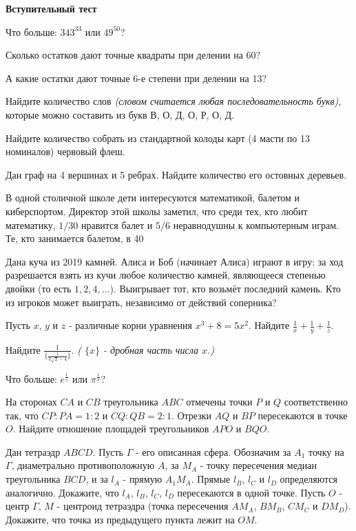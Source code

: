 \documentclass[12pt, a4paper]{article}
\begin{document}
\setcounter{iii}{0}

\begin{center}
	\textbf{Вступительный тест}
\end{center}

\ii Что больше: $343^{33}$ или $49^{50}$?

\ii Сколько остатков дают точные квадраты при делении на 60?

\ii А какие остатки дают точные 6-е степени при делении на 13?

\ii Найдите количество слов \textit{(словом считается любая последовательность букв)}, которые можно составить из букв В, О, Д, О, Р, О, Д. 

\ii Найдите количество собрать из стандартной колоды карт (4 масти по 13 номиналов) червовый флеш.

\ii Дан граф на 4 вершинах и 5 ребрах. Найдите количество его остовных деревьев.

\ii В одной столичной школе дети интересуются математикой, балетом и киберспортом. Директор этой школы заметил, что среди тех, кто любит математику, $1/30$ нравится балет и $5/6$ неравнодушны к компьютерным играм. Те, кто занимается балетом, в 40%

\ii Дана куча из 2019 камней. Алиса и Боб (начинает Алиса) играют в игру: за ход разрешается взять из кучи любое количество камней, являющееся степенью двойки (то есть $1, 2, 4, \dots$). Выигрывает тот, кто возьмёт последний камень. Кто из игроков может выиграть, независимо от действий соперника?

\ii Пусть $x$, $y$ и $z$ - различные корни уравнения $x^3+8=5x^2$. Найдите $\frac{1}{x}+\frac{1}{y}+\frac{1}{z}$.

\ii Найдите $\frac{1}{ \{ \frac{1}{ 3\sqrt{2} - 4 } \} }$. \textit{( $\{ x \}$ - дробная часть числа $x$.)}

\ii Что больше: $e^{\frac{1}{e}}$ или $\pi^{\frac{1}{\pi}}$?

\ii На сторонах $CA$ и $CB$ треугольника $ABC$ отмечены точки $P$ и $Q$ соответственно так, что $CP:PA = 1:2$ и $CQ:QB=2:1$. Отрезки $AQ$ и $BP$ пересекаются в точке $O$. Найдите отношение площадей треугольников $APO$ и $BQO$.

\ii Дан тетраэдр $ABCD$. Пусть $\Gamma$ - его описанная сфера. Обозначим за $A_1$ точку на $\Gamma$, диаметрально противоположную $A$, за $M_A$ - точку пересечения медиан треугольника $BCD$, и за $l_A$ - прямую $A_1 M_A$. Прямые $l_B$, $l_C$ и $l_D$ определяются аналогично.
\Pu Докажите, что $l_A$, $l_B$, $l_C$, $l_D$ пересекаются в одной точке.
\Pu Пусть $O$ - центр $\Gamma$, $M$ - центроид тетраэдра (точка пересечения $AM_A$, $BM_B$, $CM_C$ и $DM_D$). Докажите, что точка из предыдущего пункта лежит на $OM$.
 
\vfill
	
\end{document}

